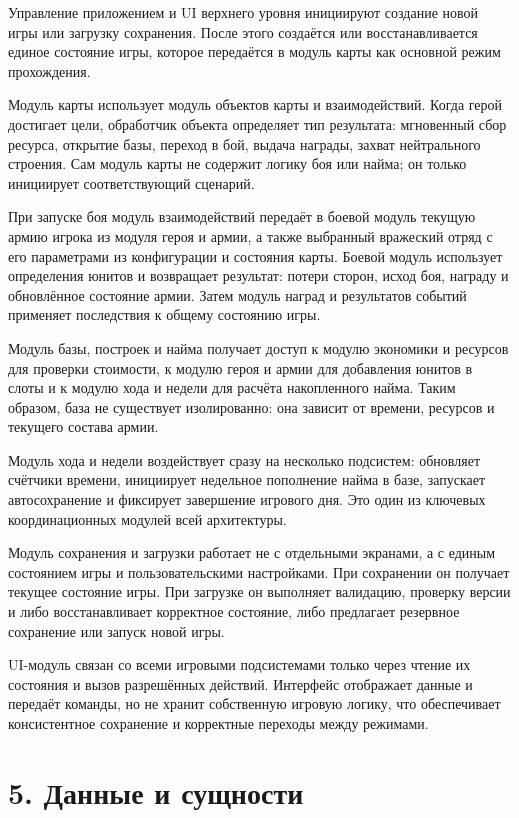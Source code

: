 \documentclass[12pt,a4paper]{article}
\begin{document}
Управление приложением и UI верхнего уровня инициируют создание новой игры или загрузку сохранения. После этого создаётся или восстанавливается единое состояние игры, которое передаётся в модуль карты как основной режим прохождения.

Модуль карты использует модуль объектов карты и взаимодействий. Когда герой достигает цели, обработчик объекта определяет тип результата: мгновенный сбор ресурса, открытие базы, переход в бой, выдача награды, захват нейтрального строения. Сам модуль карты не содержит логику боя или найма; он только инициирует соответствующий сценарий.

При запуске боя модуль взаимодействий передаёт в боевой модуль текущую армию игрока из модуля героя и армии, а также выбранный вражеский отряд с его параметрами из конфигурации и состояния карты. Боевой модуль использует определения юнитов и возвращает результат: потери сторон, исход боя, награду и обновлённое состояние армии. Затем модуль наград и результатов событий применяет последствия к общему состоянию игры.

Модуль базы, построек и найма получает доступ к модулю экономики и ресурсов для проверки стоимости, к модулю героя и армии для добавления юнитов в слоты и к модулю хода и недели для расчёта накопленного найма. Таким образом, база не существует изолированно: она зависит от времени, ресурсов и текущего состава армии.

Модуль хода и недели воздействует сразу на несколько подсистем: обновляет счётчики времени, инициирует недельное пополнение найма в базе, запускает автосохранение и фиксирует завершение игрового дня. Это один из ключевых координационных модулей всей архитектуры.

Модуль сохранения и загрузки работает не с отдельными экранами, а с единым состоянием игры и пользовательскими настройками. При сохранении он получает текущее состояние игры. При загрузке он выполняет валидацию, проверку версии и либо восстанавливает корректное состояние, либо предлагает резервное сохранение или запуск новой игры.

UI-модуль связан со всеми игровыми подсистемами только через чтение их состояния и вызов разрешённых действий. Интерфейс отображает данные и передаёт команды, но не хранит собственную игровую логику, что обеспечивает консистентное сохранение и корректные переходы между режимами.

\section*{5. Данные и сущности}
\end{document}
